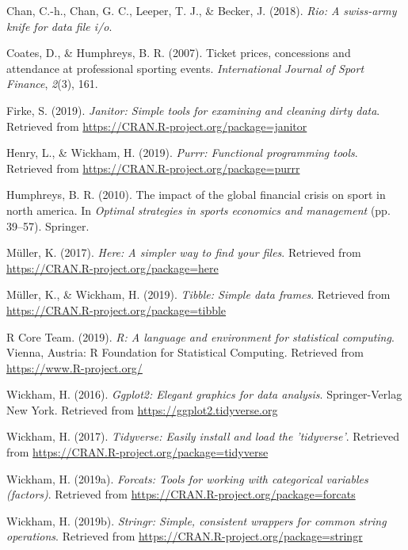 \documentclass[man, fleqn, noextraspace,floatsintext]{apa6}
\begin{document}
\hypertarget{ref-R-rio}{}
Chan, C.-h., Chan, G. C., Leeper, T. J., \& Becker, J. (2018).
\emph{Rio: A swiss-army knife for data file i/o}.

\hypertarget{ref-coates_humphreys_2007}{}
Coates, D., \& Humphreys, B. R. (2007). Ticket prices, concessions and
attendance at professional sporting events. \emph{International Journal
of Sport Finance}, \emph{2}(3), 161.

\hypertarget{ref-R-janitor}{}
Firke, S. (2019). \emph{Janitor: Simple tools for examining and cleaning
dirty data}. Retrieved from
\url{https://CRAN.R-project.org/package=janitor}

\hypertarget{ref-R-purrr}{}
Henry, L., \& Wickham, H. (2019). \emph{Purrr: Functional programming
tools}. Retrieved from \url{https://CRAN.R-project.org/package=purrr}

\hypertarget{ref-humphreys_2010}{}
Humphreys, B. R. (2010). The impact of the global financial crisis on
sport in north america. In \emph{Optimal strategies in sports economics
and management} (pp. 39--57). Springer.

\hypertarget{ref-R-here}{}
Müller, K. (2017). \emph{Here: A simpler way to find your files}.
Retrieved from \url{https://CRAN.R-project.org/package=here}

\hypertarget{ref-R-tibble}{}
Müller, K., \& Wickham, H. (2019). \emph{Tibble: Simple data frames}.
Retrieved from \url{https://CRAN.R-project.org/package=tibble}

\hypertarget{ref-R-base}{}
R Core Team. (2019). \emph{R: A language and environment for statistical
computing}. Vienna, Austria: R Foundation for Statistical Computing.
Retrieved from \url{https://www.R-project.org/}

\hypertarget{ref-R-ggplot2}{}
Wickham, H. (2016). \emph{Ggplot2: Elegant graphics for data analysis}.
Springer-Verlag New York. Retrieved from
\url{https://ggplot2.tidyverse.org}

\hypertarget{ref-R-tidyverse}{}
Wickham, H. (2017). \emph{Tidyverse: Easily install and load the
'tidyverse'}. Retrieved from
\url{https://CRAN.R-project.org/package=tidyverse}

\hypertarget{ref-R-forcats}{}
Wickham, H. (2019a). \emph{Forcats: Tools for working with categorical
variables (factors)}. Retrieved from
\url{https://CRAN.R-project.org/package=forcats}

\hypertarget{ref-R-stringr}{}
Wickham, H. (2019b). \emph{Stringr: Simple, consistent wrappers for
common string operations}. Retrieved from
\url{https://CRAN.R-project.org/package=stringr}
\end{document}
